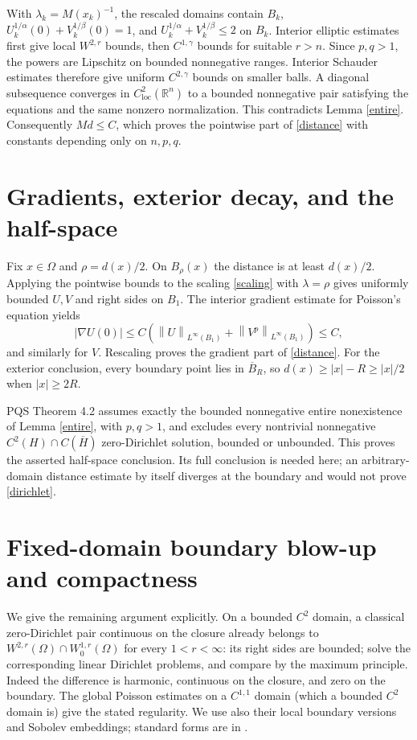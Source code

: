\documentclass[11pt]{article}
\newcommand{\R}{\mathbb R}
\newcommand{\norm}[1]{\left\lVert#1\right\rVert}
\begin{document}
With $\lambda_k=M(x_k)^{-1}$, the rescaled domains contain $B_k$,
$U_k^{1/\alpha}(0)+V_k^{1/\beta}(0)=1$, and
$U_k^{1/\alpha}+V_k^{1/\beta}\le2$ on $B_k$.
Interior elliptic estimates first give local $W^{2,r}$ bounds,
then $C^{1,\gamma}$ bounds for suitable $r>n$. Since $p,q>1$, the
powers are Lipschitz on bounded nonnegative ranges. Interior Schauder
estimates therefore give uniform $C^{2,\gamma}$ bounds on smaller
balls. A diagonal subsequence converges in $C^2_{\mathrm{loc}}(\R^n)$
to a bounded nonnegative pair satisfying the equations and the same
nonzero normalization. This contradicts Lemma \ref{entire}.
Consequently $Md\le C$, which proves the pointwise part of
\eqref{distance} with constants depending only on $n,p,q$.

\section{Gradients, exterior decay, and the half-space}
Fix $x\in\Omega$ and $\rho=d(x)/2$. On $B_\rho(x)$ the distance
is at least $d(x)/2$. Applying the pointwise bounds to the scaling
\eqref{scaling} with $\lambda=\rho$ gives uniformly bounded
$U,V$ and right sides on $B_1$. The interior gradient estimate for
Poisson's equation yields
\[
 |\nabla U(0)|\le C(\norm{U}_{L^\infty(B_1)}+
                           \norm{V^p}_{L^\infty(B_1)})\le C,
\]
and similarly for $V$. Rescaling proves the gradient part of
\eqref{distance}. For the exterior conclusion, every boundary point
lies in $\overline B_R$, so $d(x)\ge |x|-R\ge |x|/2$ when
$|x|\ge2R$.

PQS Theorem 4.2 assumes exactly the bounded nonnegative entire
nonexistence of Lemma \ref{entire}, with $p,q>1$, and excludes every
nontrivial nonnegative $C^2(H)\cap C(\overline H)$ zero-Dirichlet
solution, bounded or unbounded. This proves the asserted half-space
conclusion. Its full conclusion is needed here; an arbitrary-domain
distance estimate by itself diverges at the boundary and would not
prove \eqref{dirichlet}.

\section{Fixed-domain boundary blow-up and compactness}
We give the remaining argument explicitly. On a bounded $C^2$ domain,
a classical zero-Dirichlet pair continuous on the closure already
belongs to $W^{2,r}(\Omega)\cap W^{1,r}_0(\Omega)$ for every
$1<r<\infty$: its right sides are bounded; solve the corresponding
linear Dirichlet problems, and compare by the maximum principle.
Indeed the difference is harmonic, continuous on the closure, and zero
on the boundary. The global Poisson estimates on a $C^{1,1}$ domain
(which a bounded $C^2$ domain is) give the stated regularity. We use
also their local boundary versions and Sobolev embeddings; standard
forms are in \cite{GT}.
\end{document}
